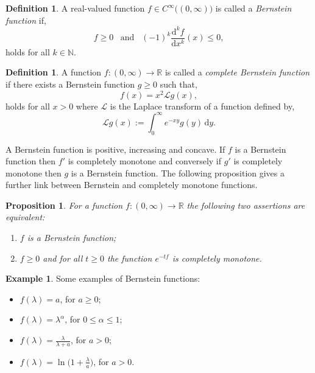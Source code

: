 \documentclass[a4paper, 12pt]{report}
\newtheorem{proposition}[theorem]{Proposition}
\theoremstyle{remark}
\theoremstyle{definition}
\newtheorem{definition}[theorem]{Definition}
\newtheorem{example}[theorem]{Example}
\begin{document}
\begin{definition}
A real-valued function $f \in C^\infty\big((0, \infty)\big)$ is called a \emph{Bernstein function} if,
\begin{equation}
f \ge 0 \,\,\,\,\, \text{and} \,\,\,\,\, (-1)^k\frac{\mathrm{d}^kf}{\mathrm{d}x^k}(x) \le 0,
\end{equation}
holds for all $k \in \mathbb{N}$.
\end{definition}

\begin{definition}
A function $f : (0, \infty) \to \mathbb{R}$ is called a \emph{complete Bernstein function} if there exists a Bernstein function $g \ge 0$ such that,
\begin{equation}
f(x) = x^2\mathcal{L}g(x),
\end{equation}
holds for all $x > 0$ where $\mathcal{L}$ is the Laplace transform of a function defined by,
$$
\mathcal{L}g(x) := \int_0^\infty e^{-xy}g(y)\,\mathrm{d}y.
$$
\end{definition}

A Bernstein function is positive, increasing and concave.  If $f$ is a Bernstein function then $f'$ is completely monotone and conversely if $g'$ is completely monotone then $g$ is a Bernstein function.  The following proposition gives a further link between Bernstein and completely monotone functions.

\begin{proposition}
For a function $f : (0, \infty) \to \mathbb{R}$ the following two assertions are equivalent:
\begin{enumerate}
\item $f$ is a Bernstein function;

\item $f \ge 0$ and for all $t \ge 0$ the function $e^{-tf}$ is completely monotone.
\end{enumerate}
\end{proposition}

\begin{example}
Some examples of Bernstein functions:
\begin{itemize}
\item $f(\lambda) = a$, for $a \ge 0$;

\item $f(\lambda) = \lambda^\alpha$, for $0 \le \alpha \le 1$;

\item $f(\lambda) = \frac{\lambda}{\lambda + a}$, for $a > 0$;

\item $f(\lambda) = \ln\big(1 + \frac{\lambda}{a}\big)$, for $a > 0$.
\end{itemize}
\end{example}
\end{document}
